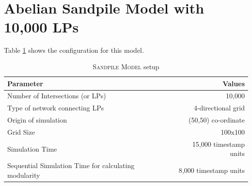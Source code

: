 \documentclass[11pt]{book}
\begin{document}
\clearpage
\section[\textsc{sandpile-10k lp}s]{Abelian Sandpile Model with 10,000 LPs}

Table \ref{table:sandpile_10k_config} shows the configuration for this model.

\begin{table}
    \centering
    \begin{tabular}{|| l | r ||}
        \hline
        Parameter                           &   Values\\ [0.5ex]
        \hline\hline
        Number of Intersections (or LPs)    &   10,000\\
        Type of network connecting LPs      &   4-directional grid\\
        Origin of simulation                &   (50,50) co-ordinate\\
        Grid Size                           &   100x100\\
        Simulation Time                     &   15,000 timestamp units\\
        Sequential Simulation Time for calculating modularity   &   8,000 timestamp units\\
        \hline
    \end{tabular}
    \caption{\textsc{Sandpile Model} setup}\label{table:sandpile_10k_config}
\end{table}
\end{document}

